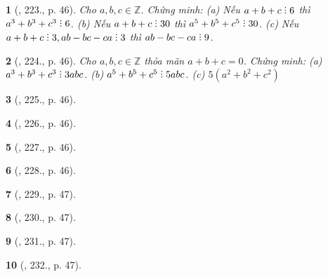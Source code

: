 \documentclass{article}
\newtheorem{baitoan}{}
\DeclareRobustCommand{\divby}{%
	\mathrel{\vbox{\baselineskip.65ex\lineskiplimit0pt\hbox{.}\hbox{.}\hbox{.}}}%
}
\begin{document}
\begin{baitoan}[\cite{Binh_Toan_8_tap_1}, 223., p. 46]
	Cho $a,b,c\in\mathbb{Z}$. Chứng minh: (a) Nếu $a + b + c\divby6$ thì $a^3 + b^3 + c^3\divby6$. (b) Nếu $a + b + c\divby30$ thì $a^5 + b^5 + c^5\divby30$. (c) Nếu $a + b + c\divby3,ab - bc - ca\divby3$ thì $ab - bc - ca\divby9$.
\end{baitoan}

\begin{baitoan}[\cite{Binh_Toan_8_tap_1}, 224., p. 46]
	Cho $a,b,c\in\mathbb{Z}$ thỏa mãn $a + b + c = 0$. Chứng minh: (a) $a^3 + b^3 + c^3\divby3abc$. (b) $a^5 + b^5 + c^5\divby5abc$. (c) $5(a^2 + b^2 + c^2)$
\end{baitoan}

\begin{baitoan}[\cite{Binh_Toan_8_tap_1}, 225., p. 46]
	
\end{baitoan}

\begin{baitoan}[\cite{Binh_Toan_8_tap_1}, 226., p. 46]
	
\end{baitoan}

\begin{baitoan}[\cite{Binh_Toan_8_tap_1}, 227., p. 46]
	
\end{baitoan}

\begin{baitoan}[\cite{Binh_Toan_8_tap_1}, 228., p. 46]
	
\end{baitoan}

\begin{baitoan}[\cite{Binh_Toan_8_tap_1}, 229., p. 47]
	
\end{baitoan}

\begin{baitoan}[\cite{Binh_Toan_8_tap_1}, 230., p. 47]
	
\end{baitoan}

\begin{baitoan}[\cite{Binh_Toan_8_tap_1}, 231., p. 47]
	
\end{baitoan}

\begin{baitoan}[\cite{Binh_Toan_8_tap_1}, 232., p. 47]
	
\end{baitoan}
\end{document}
